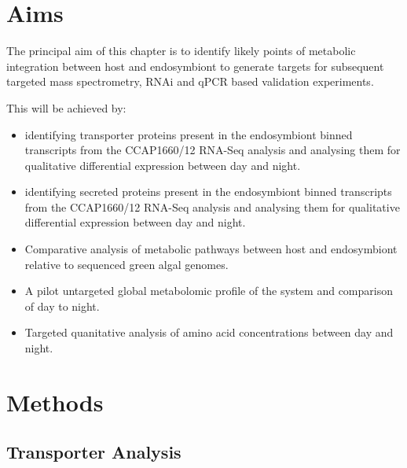 \section{Aims}

The principal aim of this chapter is to identify
likely points of metabolic integration between host and 
endosymbiont to generate targets for subsequent 
targeted mass spectrometry, RNAi and qPCR based validation
experiments. 

This will be achieved by:
\begin{itemize}
\item identifying
    transporter proteins present in the endosymbiont
    binned transcripts from the CCAP1660/12 RNA-Seq analysis
    and analysing them for qualitative differential 
    expression between day and night. 
\item identifying
    secreted proteins present in the endosymbiont
    binned transcripts from the CCAP1660/12 RNA-Seq analysis
    and analysing them for qualitative differential 
    expression between day and night. 
\item Comparative analysis of metabolic pathways 
    between host and endosymbiont relative to 
    sequenced green algal genomes. 
\item A pilot untargeted global metabolomic profile of the 
    system and comparison of day to night.
\item Targeted quanitative analysis of amino acid concentrations
    between day and night. 
\end{itemize}

\section{Methods}
\subsection{Transporter Analysis} 
